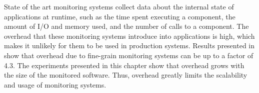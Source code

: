 %

State of the art monitoring systems \cite{FrenotS04,KregerHaroldWilliamson03,Binder200645} collect data about the internal state of applications at runtime, such as the time spent executing a component, the amount of I/O and memory used, and the number of calls to a component.
The overhead that these monitoring systems introduce into applications is high, which makes it unlikely for them to be used in production systems.
Results presented in \cite{Binder:2009:PPV:1464245.1464249} show that overhead due to fine-grain monitoring systems can be up to a factor of 4.3.
The experiments presented in this chapter show that overhead grows with the size of the monitored software.
Thus, overhead greatly limits the scalability and usage of monitoring systems.

